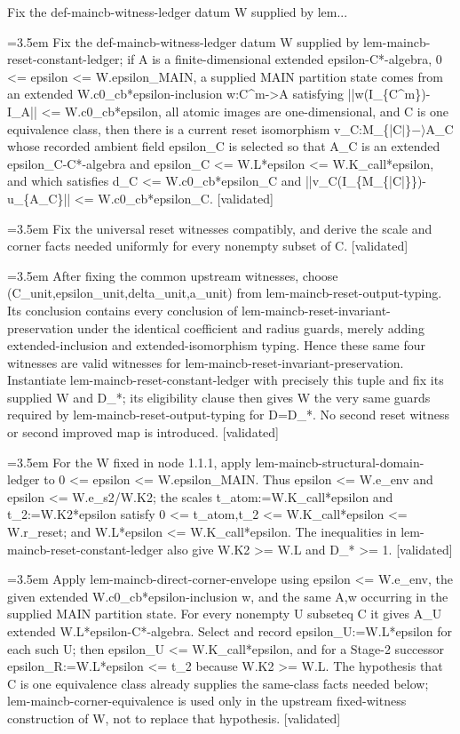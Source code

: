 \documentclass{article}
\newcommand{\step}[1]{\par\noindent\hangindent=3.5em\hangafter=1%
  \makebox[3.5em][l]{\textbf{#1.}}}
\newcommand{\steptag}[1]{\hfill{\small\textsf{[#1]}}}
\begin{document}
\begin{proofbox}{Fix the def-maincb-witness-ledger datum W supplied by lem...}
\step{1} Fix the def-maincb-witness-ledger datum W supplied by lem-maincb-reset-constant-ledger; if A is a finite-dimensional extended epsilon-C*-algebra, 0 <= epsilon <= W.epsilon\_MAIN, a supplied MAIN partition state comes from an extended W.c0\_cb*epsilon-inclusion w:C\textasciicircum{}m->A satisfying ||w(I\_\{C\textasciicircum{}m\})-I\_A|| <= W.c0\_cb*epsilon, all atomic images are one-dimensional, and C is one equivalence class, then there is a current reset isomorphism v\_C:M\_\{|C$|\}-\rangle$A\_C whose recorded ambient field epsilon\_C is selected so that A\_C is an extended epsilon\_C-C*-algebra and epsilon\_C <= W.L*epsilon <= W.K\_call*epsilon, and which satisfies d\_C <= W.c0\_cb*epsilon\_C and ||v\_C(I\_\{M\_\{|C|\}\})-u\_\{A\_C\}|| <= W.c0\_cb*epsilon\_C. \steptag{validated} \\[6pt]
\step{1.1} Fix the universal reset witnesses compatibly, and derive the scale and corner facts needed uniformly for every nonempty subset of C. \steptag{validated} \\[6pt]
\step{1.1.1} After fixing the common upstream witnesses, choose (C\_unit,epsilon\_unit,delta\_unit,a\_unit) from lem-maincb-reset-output-typing. Its conclusion contains every conclusion of lem-maincb-reset-invariant-preservation under the identical coefficient and radius guards, merely adding extended-inclusion and extended-isomorphism typing. Hence these same four witnesses are valid witnesses for lem-maincb-reset-invariant-preservation. Instantiate lem-maincb-reset-constant-ledger with precisely this tuple and fix its supplied W and D\_*; its eligibility clause then gives W the very same guards required by lem-maincb-reset-output-typing for D=D\_*. No second reset witness or second improved map is introduced. \steptag{validated} \\[4pt]
\step{1.1.2} For the W fixed in node 1.1.1, apply lem-maincb-structural-domain-ledger to 0 <= epsilon <= W.epsilon\_MAIN. Thus epsilon <= W.e\_env and epsilon <= W.e\_s2/W.K2; the scales t\_atom:=W.K\_call*epsilon and t\_2:=W.K2*epsilon satisfy 0 <= t\_atom,t\_2 <= W.K\_call*epsilon <= W.r\_reset; and W.L*epsilon <= W.K\_call*epsilon. The inequalities in lem-maincb-reset-constant-ledger also give W.K2 >= W.L and D\_* >= 1. \steptag{validated} \\[4pt]
\step{1.1.3} Apply lem-maincb-direct-corner-envelope using epsilon <= W.e\_env, the given extended W.c0\_cb*epsilon-inclusion w, and the same A,w occurring in the supplied MAIN partition state. For every nonempty U subseteq C it gives A\_U extended W.L*epsilon-C*-algebra. Select and record epsilon\_U:=W.L*epsilon for each such U; then epsilon\_U <= W.K\_call*epsilon, and for a Stage-2 successor epsilon\_R:=W.L*epsilon <= t\_2 because W.K2 >= W.L. The hypothesis that C is one equivalence class already supplies the same-class facts needed below; lem-maincb-corner-equivalence is used only in the upstream fixed-witness construction of W, not to replace that hypothesis. \steptag{validated} \\[4pt]

\end{proofbox}
\end{document}

